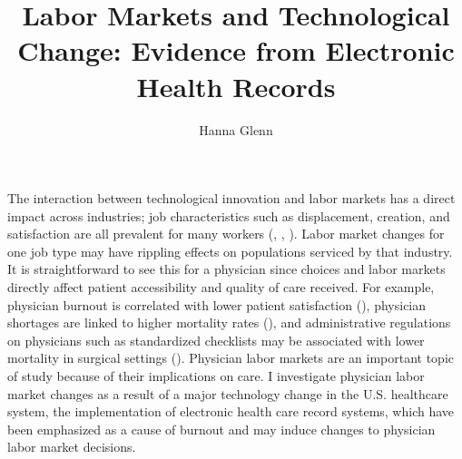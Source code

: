 \documentclass[11pt]{article}
\title{Labor Markets and Technological Change: Evidence from Electronic Health Records}
\author{Hanna Glenn}
\begin{document}
\maketitle



\vspace{1.5cm}

The interaction between technological innovation and labor markets has a direct impact across industries; job characteristics such as displacement, creation, and satisfaction are all prevalent for many workers (\cite{autor2003skill}, \cite{fallick1996review}, \cite{akerlof1988job}). Labor market changes for one job type may have rippling effects on populations serviced by that industry. It is straightforward to see this for a physician since choices and labor markets directly affect patient accessibility and quality of care received. For example, physician burnout is correlated with lower patient satisfaction (\cite{shanafelt2002burnout}), physician shortages are linked to higher mortality rates (\cite{gong2019higher}), and administrative regulations on physicians such as standardized checklists may be associated with lower mortality in surgical settings (\cite{treadwell2014surgical}). Physician labor markets are an important topic of study because of their implications on care. I investigate physician labor market changes as a result of a major technology change in the U.S. healthcare system, the implementation of electronic health care record systems, which have been emphasized as a cause of burnout and may induce changes to physician labor market decisions.
\end{document}
